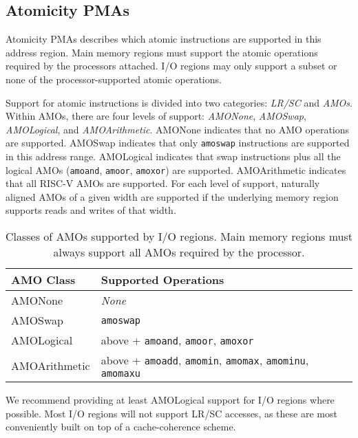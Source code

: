 \subsection{Atomicity PMAs}

Atomicity PMAs describes which atomic instructions are supported in
this address region.  Main memory regions must support the atomic
operations required by the processors attached.  I/O regions may only
support a subset or none of the processor-supported atomic operations.

Support for atomic instructions is divided into two categories: {\em
  LR/SC} and {\em AMOs}. Within AMOs, there are four levels of
support: {\em AMONone}, {\em AMOSwap}, {\em AMOLogical}, and {\em
  AMOArithmetic}.  AMONone indicates that no AMO operations are
supported.  AMOSwap indicates that only {\tt amoswap} instructions are
supported in this address range.  AMOLogical indicates that swap
instructions plus all the logical AMOs ({\tt amoand}, {\tt amoor},
{\tt amoxor}) are supported.  AMOArithmetic indicates that all RISC-V
AMOs are supported.  For each level of support, naturally aligned AMOs
of a given width are supported if the underlying memory region
supports reads and writes of that width.

\begin{table*}[h!]
\begin{center}
\begin{tabular}{|l|l|}
  \hline
  AMO Class & Supported Operations \\
  \hline
  AMONone       & {\em None} \\
  AMOSwap       & {\tt amoswap} \\
  AMOLogical    & above + {\tt amoand}, {\tt amoor}, {\tt amoxor} \\
  AMOArithmetic & above + {\tt amoadd}, {\tt amomin}, {\tt amomax}, {\tt amominu}, {\tt amomaxu} \\
  \hline
\end{tabular}
\end{center}
\caption{Classes of AMOs supported by I/O regions.  Main memory
  regions must always support all AMOs required by the processor.}
\label{amoclasses}
\end{table*}

\begin{commentary}
We recommend providing at least AMOLogical support for I/O regions
where possible.  Most I/O regions will not support LR/SC accesses, as
these are most conveniently built on top of a cache-coherence scheme.
\end{commentary}

